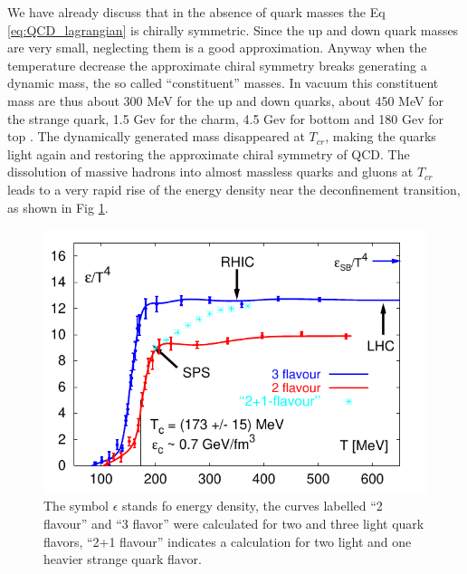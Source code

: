 \documentclass[12pt,a4paper]{book}
\begin{document}
	We have already discuss that in the absence of quark masses the Eq \ref{eq:QCD_lagrangian} is chirally symmetric. Since the up and down quark masses are very small, neglecting them is a good approximation. Anyway when the temperature decrease the approximate chiral symmetry breaks generating a dynamic mass, the so called “constituent” masses. In vacuum this constituent mass are thus about 300 MeV for the up and down quarks, about 450 MeV for the strange quark, 1.5 Gev for the charm, 4.5 Gev for bottom and 180 Gev for top \cite{Semprini}. The dynamically generated mass disappeared at $T_{cr}$, making the quarks light again and restoring the approximate chiral symmetry of QCD. The dissolution of massive hadrons into almost massless quarks and gluons at $T_{cr}$ leads to a very rapid rise of the energy density near the deconfinement transition, as shown in Fig \ref{fig:deconfinement}.
	\begin{figure}[ht]
		\centering
		\includegraphics[width=0.7\linewidth]{pictures/deconfinement.png}
		\caption{The symbol $\epsilon$ stands fo energy density, the curves labelled “2 flavour” and “3 flavor” were calculated for two and three light quark flavors, “2+1 flavour” indicates a calculation for two light and one heavier strange quark flavor.}
		\label{fig:deconfinement} 
	\end{figure}
\end{document}
